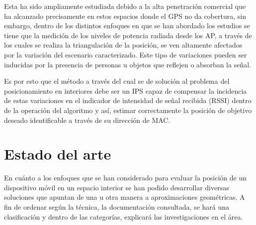 Esta ha sido ampliamente estudiada debido a la alta penetración comercial que ha alcanzado precisamente en estos espacios donde el GPS no da cobertura, sin embargo, dentro de los distintos enfoques en que se han abordado los estudios se tiene que la medición de los niveles de potencia radiada desde los \ac{AP}, a través de los cuales se realiza la triangulación de la posición, se ven altamente afectados por la variación del escenario caracterizado. Este tipo de variaciones pueden ser inducidas por la presencia de personas u objetos que reflejen o absorban la señal.

Es por esto que el método a través del cual se de solución al problema del posicionamiento en interiores debe ser un \ac{IPS} capaz de compensar la incidencia de estas variaciones en el indicador de intensidad de señal recibida (RSSI) dentro de la operación del algoritmo y así, estimar correctamente la posición de objetivo deseado identificable a través de su dirección de \ac{MAC}.

\section{Estado del arte}

En cuánto a los enfoques que se han considerado para evaluar la posición de un dispositivo móvil en un espacio interior se han podido desarrollar diversas soluciones que apuntan de una u otra manera a aproximaciones geométricas. A fin de ordenar según la técnica, la documentación consultada, se hará una clasificación y dentro de las categorías, explicará las investigaciones en el área.

                \clearpage 

